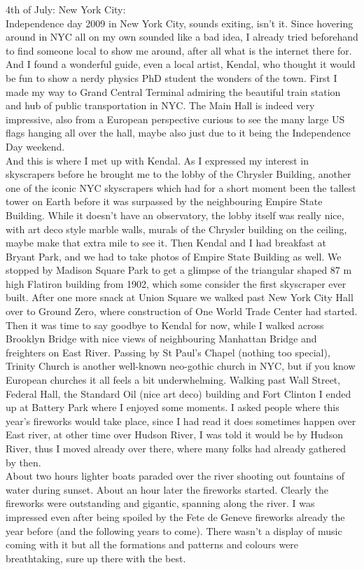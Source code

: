 4th of July: New York City:\\
Independence day 2009 in New York City, sounds exiting, isn't it. Since hovering around in NYC all on my own sounded like a bad idea, I already tried beforehand to find someone local to show me around, after all what is the internet there for. And I found a wonderful guide, even a local artist, Kendal, who thought it would be fun to show a nerdy physics PhD student the wonders of the town. First I made my way to Grand Central Terminal admiring the beautiful train station and hub of public transportation in NYC. The Main Hall is indeed very impressive, also from a European perspective curious to see the many large US flags hanging all over the hall, maybe also just due to it being the Independence Day weekend. \\
And this is where I met up with Kendal. As I expressed my interest in skyscrapers before he brought me to the lobby of the Chrysler Building, another one of the iconic NYC skyscrapers which had for a short moment been the tallest tower on Earth before it was surpassed by the neighbouring Empire State Building. While it doesn't have an observatory, the lobby itself was really nice, with art deco style marble walls, murals of the Chrysler building on the ceiling, maybe make that extra mile to see it. Then Kendal and I had breakfast at Bryant Park, and we had to take photos of Empire State Building as well. We stopped by Madison Square Park to get a glimpse of the triangular shaped 87 m high Flatiron building from 1902, which some consider the first skyscraper ever built. After one more snack at Union Square we walked past New York City Hall over to Ground Zero, where construction of One World Trade Center had started. \\
Then it was time to say goodbye to Kendal for now, while I walked across Brooklyn Bridge with nice views of neighbouring Manhattan Bridge and freighters on East River. Passing by St Paul's Chapel (nothing too special), Trinity Church is another well-known neo-gothic church in NYC, but if you know European churches it all feels a bit underwhelming. Walking past Wall Street, Federal Hall, the Standard Oil (nice art deco) building and Fort Clinton I ended up at Battery Park where I enjoyed some moments. I asked people where this year's fireworks would take place, since I had read it does sometimes happen over East river, at other time over Hudson River, I was told it would be by Hudson River, thus I moved already over there, where many folks had already gathered by then.\\
About two hours lighter boats paraded over the river shooting out fountains of water during sunset. About an hour later the fireworks started. Clearly the fireworks were outstanding and gigantic, spanning along the river. I was impressed even after being spoiled by the Fete de Geneve fireworks already the year before (and the following years to come). There wasn't a display of music coming with it but all the formations and patterns and colours were breathtaking, sure up there with the best.\\

